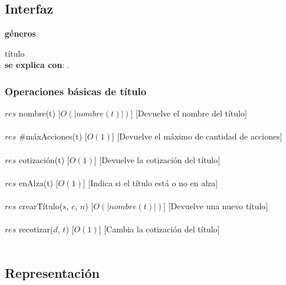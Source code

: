 \subsection{Interfaz}


   \parbox{1.7cm}{\textbf{g\'eneros}} t\'itulo\\
    
  \textbf{se explica con}: .


  \subsubsection{Operaciones b\'asicas de t\'itulo}

  {$res$ \igobs nombre(t)}
  [$O(|nombre(t)|)$]
  [Devuelve el nombre del t\'itulo]\\\\

  {$res$ \igobs $\#$m\'axAcciones(t)}
  [$O(1)$]
  [Devuelve el m\'aximo de cantidad de acciones]\\\\

  {$res$ \igobs cotizaci\'on(t)}
  [$O(1)$]
  [Devuelve la cotizaci\'on del t\'itulo]\\\\

  {$res$ \igobs enAlza(t)}
  [$O(1)$]
  [Indica si el t\'itulo est\'a o no en alza]\\\\

  {$res$ \igobs crearT\'itulo($s$, $c$, $n$)}
  [$O(|nombre(t)|)$]
  [Devuelve una nuevo t\'itulo]\\\\

  {$res$ \igobs recotizar($d$, $t$)}
  [$O(1)$]
  [Cambia la cotizaci\'on del t\'itulo]\\\\


\subsection{Representaci\'on}
